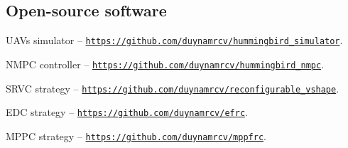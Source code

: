 \subsection*{Open-source software}
UAVs simulator -- {\tt\url{https://github.com/duynamrcv/hummingbird_simulator}}.

NMPC controller -- {\tt\url{https://github.com/duynamrcv/hummingbird_nmpc}}.

SRVC strategy -- {\tt\url{https://github.com/duynamrcv/reconfigurable_vshape}}.

EDC strategy -- {\tt\url{https://github.com/duynamrcv/efrc}}.

MPPC strategy -- {\tt\url{https://github.com/duynamrcv/mppfrc}}.